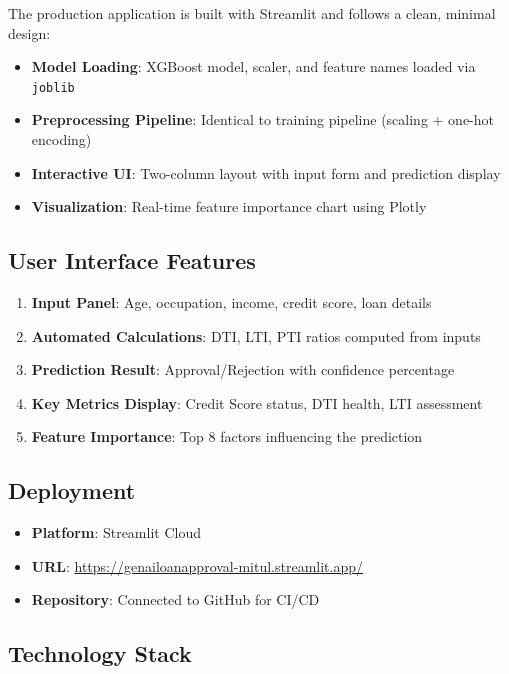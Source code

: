 \documentclass[12pt,a4paper]{article}
\begin{document}
The production application is built with Streamlit and follows a clean, minimal design:

\begin{itemize}
    \item \textbf{Model Loading}: XGBoost model, scaler, and feature names loaded via \texttt{joblib}
    \item \textbf{Preprocessing Pipeline}: Identical to training pipeline (scaling + one-hot encoding)
    \item \textbf{Interactive UI}: Two-column layout with input form and prediction display
    \item \textbf{Visualization}: Real-time feature importance chart using Plotly
\end{itemize}

\subsection{User Interface Features}

\begin{enumerate}
    \item \textbf{Input Panel}: Age, occupation, income, credit score, loan details
    \item \textbf{Automated Calculations}: DTI, LTI, PTI ratios computed from inputs
    \item \textbf{Prediction Result}: Approval/Rejection with confidence percentage
    \item \textbf{Key Metrics Display}: Credit Score status, DTI health, LTI assessment
    \item \textbf{Feature Importance}: Top 8 factors influencing the prediction
\end{enumerate}

\subsection{Deployment}

\begin{itemize}
    \item \textbf{Platform}: Streamlit Cloud
    \item \textbf{URL}: \url{https://genailoanapproval-mitul.streamlit.app/}
    \item \textbf{Repository}: Connected to GitHub for CI/CD
\end{itemize}

\subsection{Technology Stack}
\end{document}
